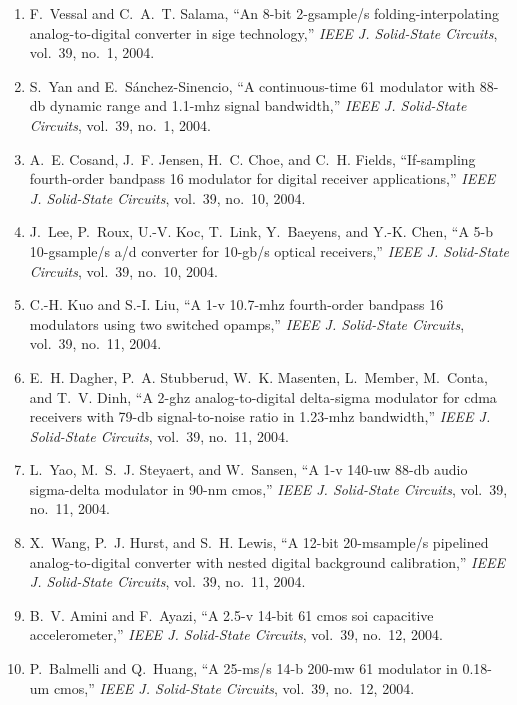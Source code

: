 \begin{enumerate}
\item
F.~Vessal and C.~A.~T. Salama, ``An 8-bit 2-gsample/s folding-interpolating
  analog-to-digital converter in sige technology,'' \emph{{IEEE} J. Solid-State
  Circuits}, vol.~39, no.~1, 2004.

\item
S.~Yan and E.~Sánchez-Sinencio, ``A continuous-time 61 modulator with 88-db
  dynamic range and 1.1-mhz signal bandwidth,'' \emph{{IEEE} J. Solid-State
  Circuits}, vol.~39, no.~1, 2004.

\item
A.~E. Cosand, J.~F. Jensen, H.~C. Choe, and C.~H. Fields, ``If-sampling
  fourth-order bandpass 16 modulator for digital receiver applications,''
  \emph{{IEEE} J. Solid-State Circuits}, vol.~39, no.~10, 2004.

\item
J.~Lee, P.~Roux, U.-V. Koc, T.~Link, Y.~Baeyens, and Y.-K. Chen, ``A 5-b
  10-gsample/s a/d converter for 10-gb/s optical receivers,'' \emph{{IEEE} J.
  Solid-State Circuits}, vol.~39, no.~10, 2004.

\item
C.-H. Kuo and S.-I. Liu, ``A 1-v 10.7-mhz fourth-order bandpass 16 modulators
  using two switched opamps,'' \emph{{IEEE} J. Solid-State Circuits}, vol.~39,
  no.~11, 2004.

\item
E.~H. Dagher, P.~A. Stubberud, W.~K. Masenten, L.~Member, M.~Conta, and T.~V.
  Dinh, ``A 2-ghz analog-to-digital delta-sigma modulator for cdma receivers
  with 79-db signal-to-noise ratio in 1.23-mhz bandwidth,'' \emph{{IEEE} J.
  Solid-State Circuits}, vol.~39, no.~11, 2004.

\item
L.~Yao, M.~S.~J. Steyaert, and W.~Sansen, ``A 1-v 140-uw 88-db audio
  sigma-delta modulator in 90-nm cmos,'' \emph{{IEEE} J. Solid-State Circuits},
  vol.~39, no.~11, 2004.

\item
X.~Wang, P.~J. Hurst, and S.~H. Lewis, ``A 12-bit 20-msample/s pipelined
  analog-to-digital converter with nested digital background calibration,''
  \emph{{IEEE} J. Solid-State Circuits}, vol.~39, no.~11, 2004.

\item
B.~V. Amini and F.~Ayazi, ``A 2.5-v 14-bit 61 cmos soi capacitive
  accelerometer,'' \emph{{IEEE} J. Solid-State Circuits}, vol.~39, no.~12,
  2004.

\item
P.~Balmelli and Q.~Huang, ``A 25-ms/s 14-b 200-mw 61 modulator in 0.18-um
  cmos,'' \emph{{IEEE} J. Solid-State Circuits}, vol.~39, no.~12, 2004.


\end{enumerate}
